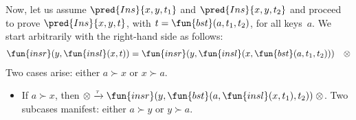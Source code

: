 Now, let us assume \(\pred{Ins}{x,y,t_1}\) and \(\pred{Ins}{x,y,t_2}\)
and proceed to prove \(\pred{Ins}{x,y,t}\), with
\(t=\fun{bst}(a,t_1,t_2)\), for all keys~\(a\). We start arbitrarily
with the right\hyp{}hand side as follows:
\begin{equation*}
\begin{array}{@{}r@{\;}l@{\;}l@{\quad}r@{}}
  \fun{insr}(y,\fun{insl}(x,t))
& = & \fun{insr}(y,\fun{insl}(x,\fun{bst}(a,t_1,t_2))) & \otimes
\end{array}
\end{equation*}
Two cases arise: either \(a \succ x\) or \(x \succ a\).
\begin{itemize}

\item If \(a \succ x\), then \(\otimes \xrightarrow{\smash{\tau}}
  \fun{insr}(y,\fun{bst}(a,\fun{insl}(x,t_1),t_2)) \; \otimes\). Two
  subcases manifest: either \(a \succ y\) or \(y \succ a\).
  \begin{itemize}


\end{itemize}
\end{itemize}

